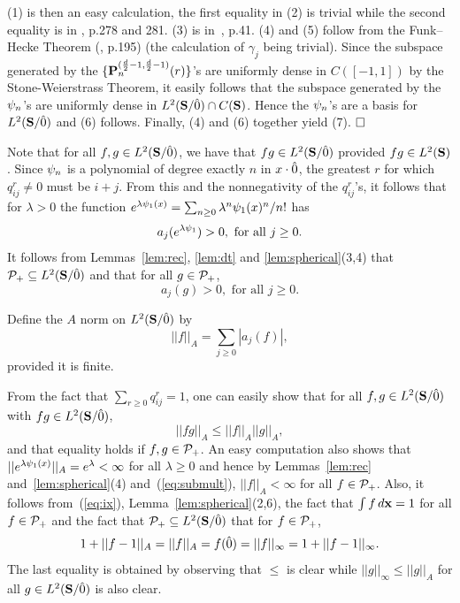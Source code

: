 (1) is then an easy calculation, the first equality in (2) is trivial 
while the second equality is in \cite{R}, p.278 and 281. 
(3) is in~\cite{Askey74}, 
p.41. (4) and (5) follow from the Funk--Hecke Theorem (\cite{N}, p.195)
(the calculation of $\gamma_j$ being trivial).
Since the subspace generated by the 
$\{\P^{({d \over 2}-1 ,{d \over 2}-1)}_n(r)\}$'s are uniformly dense 
in $C([-1,1])$ by the Stone-Weierstrass Theorem, it easily follows that the 
subspace generated by the $\f_n$'s are uniformly dense in $\ltsg\cap C(\S)$.
Hence the $\f_n$'s are a basis for $\ltsg$ and (6) follows.
Finally, (4) and (6) together yield (7). $\qed$

Note that for all $f,g\in \ltsg$, we have that
$fg\in \ltsg$ provided $fg\in \lts$.
Since $\f_n$ is a polynomial of degree exactly $n$ in $x\cdot \zero$,
the greatest $r$ for which
$q^r_{ij} \neq 0$ must be $i + j$.  From this and the nonnegativity 
of the $q^r_{ij}$'s, it follows that for $\lambda > 0$ the function 
$e^{\lambda \f_1(x)} = \sum_{n \geq 0} \lambda^n \f_1 (x)^n / n!$ has
\begin{equation} \label{eq:viii}
a_j (e^{\lambda \f_1}) > 0 , \mbox{  for all } j\ge 0.
\end{equation}
It follows from Lemmas~\ref{lem:rec}, \ref{lem:dt} 
and \ref{lem:spherical}(3,4) that $\PP_+\subseteq \ltsg$ and that
for all $g \in \PP_+$,
\begin{equation} \label{eq:ix}
a_j (g) > 0, \mbox{  for all } j\ge 0.
\end{equation}

\begin{defn}
Define the $A$ norm on $\ltsg$ by
$$||f||_A = \sum_{j\ge 0} |a_j (f)| ,$$
provided it is finite.
\end{defn}

 From the fact that $\sum_{r\ge 0} q^r_{ij} = 1$, one can easily show 
that for all $f,g\in\ltsg$ with $fg\in\ltsg$,
\begin{equation} \label{eq:submult}
||fg||_A \leq ||f||_A ||g||_A , 
\end{equation}
and that equality holds if $f , g \in \PP_+$. An easy computation also 
shows that $||e^{\lambda \f_1(x)}||_A =e^{\lambda} <\infty$ 
for all $\lambda \ge 0$
and hence by Lemmas~\ref{lem:rec} and~\ref{lem:spherical}(4)
and~(\ref{eq:submult}), $||f||_A<\infty$ for all $f\in\PP_+$.
Also, it follows from~(\ref{eq:ix}), Lemma~\ref{lem:spherical}(2,6),
the fact that $\int f \, \dx = 1$ for all $f \in \PP_+$ and the fact
that $\PP_+\subseteq \ltsg$ that for $f \in \PP_+$,
\begin{equation} \label{eq:x}
1 + ||f - 1||_A = ||f||_A = f (\zero) = ||f||_\infty = 
   1 + ||f - 1||_\infty . 
\end{equation}
The last equality is obtained by observing that $\le$ is clear while
$ ||g||_\infty \le ||g ||_A $ for all $g\in \ltsg$ is also clear.

